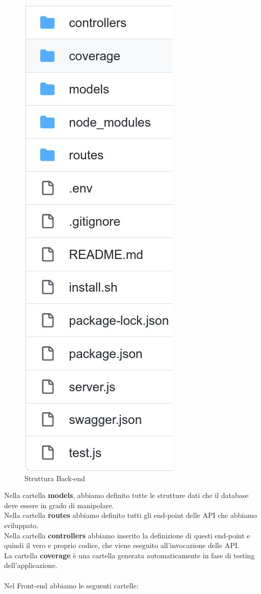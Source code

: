 \begin{figure}[!h]
\centering
\includegraphics[scale=0.3]{images/struttura_back-end.jpg}
\caption{Struttura Back-end }
\label{fig:struttura_back}
\end{figure}
\noindent
Nella cartella \textbf{models}, abbiamo definito tutte le strutture dati che il database deve essere in grado di manipolare. \\
Nella cartella \textbf{routes} abbiamo definito tutti gli end-point delle API che abbiamo sviluppato. \\
Nella cartella \textbf{controllers} abbiamo inserito la definizione di questi end-point e quindi il vero e proprio codice, che viene eseguito all'invocazione delle API. \\
La cartella \textbf{coverage} è una cartella generata automaticamente in fase di testing dell'applicazione. \\
\\
\newpage
Nel Front-end abbiamo le seguenti cartelle:

